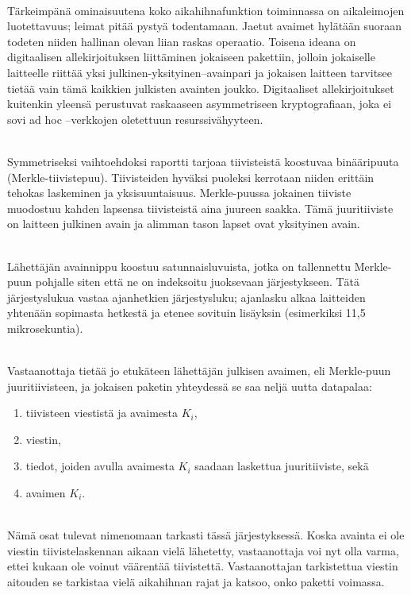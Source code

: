 \documentclass[finnish]{tktltiki2}
\theoremstyle{definition}
\theoremstyle{remark}
\begin{document}
\noindent \\
Tärkeimpänä ominaisuutena koko aikahihnafunktion toiminnassa on aikaleimojen luotettavuus; leimat pitää pystyä todentamaan. Jaetut avaimet hylätään suoraan todeten niiden hallinan olevan liian raskas operaatio. Toisena ideana on digitaalisen allekirjoituksen liittäminen jokaiseen pakettiin, jolloin jokaiselle laitteelle riittää yksi julkinen-yksityinen–avainpari ja jokaisen laitteen tarvitsee tietää vain tämä kaikkien julkisten avainten joukko. Digitaaliset allekirjoitukset kuitenkin yleensä perustuvat raskaaseen asymmetriseen kryptografiaan, joka ei sovi ad hoc –verkkojen oletettuun resurssivähyyteen.

\noindent \\
Symmetriseksi vaihtoehdoksi raportti tarjoaa tiivisteistä koostuvaa binääripuuta (Merkle-tiivistepuu). Tiivisteiden hyväksi puoleksi kerrotaan niiden erittäin tehokas laskeminen ja yksisuuntaisuus. Merkle-puussa jokainen tiiviste muodostuu kahden lapsensa tiivisteistä aina juureen saakka. Tämä juuritiiviste on laitteen julkinen avain ja alimman tason lapset ovat yksityinen avain.

\noindent \\
Lähettäjän avainnippu koostuu satunnaisluvuista, jotka on tallennettu Merkle-puun pohjalle siten että ne on indeksoitu juoksevaan järjestykseen. Tätä järjestyslukua vastaa ajanhetkien järjestysluku; ajanlasku alkaa laitteiden yhtenään sopimasta hetkestä ja etenee sovituin lisäyksin (esimerkiksi 11,5 mikrosekuntia). 

\noindent \\
Vastaanottaja tietää jo etukäteen lähettäjän julkisen avaimen, eli Merkle-puun juuritiivisteen, ja jokaisen paketin yhteydessä se saa neljä uutta datapalaa:

\begin{enumerate}
\item tiivisteen viestistä ja avaimesta $K_i$,
\item viestin,
\item tiedot, joiden avulla avaimesta $K_i$ saadaan laskettua juuritiiviste, sekä
\item avaimen $K_i$.
\end{enumerate}

\noindent \\
Nämä osat tulevat nimenomaan tarkasti tässä järjestyksessä. Koska avainta ei ole viestin tiivistelaskennan aikaan vielä lähetetty, vastaanottaja voi nyt olla varma, ettei kukaan ole voinut väärentää tiivistettä. Vastaanottajan tarkistettua viestin aitouden se tarkistaa vielä aikahihnan rajat ja katsoo, onko paketti voimassa.
\end{document}
